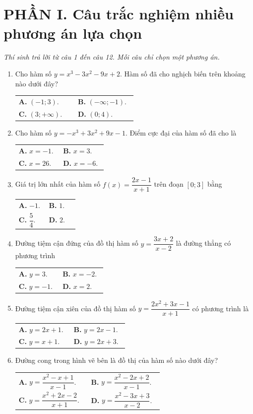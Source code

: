 \documentclass[12pt,a4paper]{article}
\makeatletter
\newcommand{\bonpa}[4]{\par\nobreak\smallskip\nobreak\noindent
\begin{tabular}{@{}p{0.47\linewidth}p{0.47\linewidth}@{}}
\textbf{A.} #1 & \textbf{B.} #2\\[8pt]
\textbf{C.} #3 & \textbf{D.} #4\end{tabular}}
\makeatother
\begin{document}
\section*{\large PHẦN I. Câu trắc nghiệm nhiều phương án lựa chọn}
\textit{Thí sinh trả lời từ câu 1 đến câu 12. Mỗi câu chỉ chọn một phương án.}
\begin{enumerate}
\item Cho hàm số $y=x^3-3x^2-9x+2$. Hàm số đã cho nghịch biến trên khoảng nào dưới đây?
\bonpa{$(-1;3)$.}{$(-\infty;-1)$.}{$(3;+\infty)$.}{$(0;4)$.}

\item Cho hàm số $y=-x^3+3x^2+9x-1$. Điểm cực đại của hàm số đã cho là
\bonpa{$x=-1$.}{$x=3$.}{$x=26$.}{$x=-6$.}

\item Giá trị lớn nhất của hàm số $f(x)=\dfrac{2x-1}{x+1}$ trên đoạn $[0;3]$ bằng
\bonpa{$-1$.}{$1$.}{$\dfrac{5}{4}$.}{$2$.}

\item Đường tiệm cận đứng của đồ thị hàm số $y=\dfrac{3x+2}{x-2}$ là đường thẳng có phương trình
\bonpa{$y=3$.}{$x=-2$.}{$y=-1$.}{$x=2$.}

\item Đường tiệm cận xiên của đồ thị hàm số $y=\dfrac{2x^2+3x-1}{x+1}$ có phương trình là
\bonpa{$y=2x+1$.}{$y=2x-1$.}{$y=x+1$.}{$y=2x+3$.}

\item Đường cong trong hình vẽ bên là đồ thị của hàm số nào dưới đây?
\par\nobreak\smallskip
\begin{minipage}[c]{0.62\linewidth}
\bonpa{$y=\dfrac{x^2-x+1}{x-1}$.}{$y=\dfrac{x^2-2x+2}{x-1}$.}{$y=\dfrac{x^2+2x-2}{x+1}$.}{$y=\dfrac{x^2-3x+3}{x-2}$.}
\end{minipage}\hfill
\begin{minipage}[c]{0.36\linewidth}\centering
{}
\end{minipage}
\end{enumerate}
\end{document}
